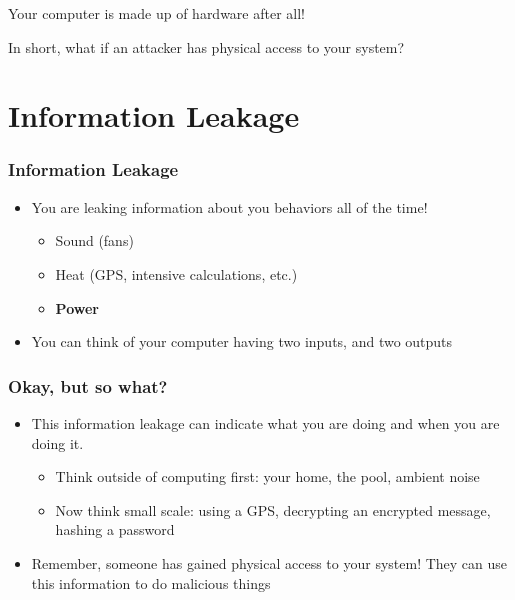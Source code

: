 \documentclass{beamer}
\begin{document}
\begin{frame}
    \begin{center}Your computer is made up of hardware after all!\end{center}
\end{frame}

\begin{frame}
    \begin{center}In short, what if an attacker has physical access to your system?\end{center}
\end{frame}
\section{}

\section{Information Leakage}

\begin{frame}[t]
\frametitle{Information Leakage}
\begin{itemize}
    \item You are leaking information about you behaviors all of the time!
    \begin{itemize}
        \item Sound (fans)
        \item Heat (GPS, intensive calculations, etc.)
        \item \textbf{Power}
    \end{itemize}
    \item You can think of your computer having two inputs, and two outputs
\end{itemize}
\end{frame}

\begin{frame}[t]
\frametitle{Okay, but so what?}
\begin{itemize}
    \item This information leakage can indicate what you are doing and when you are doing it.
    \begin{itemize}
        \item Think outside of computing first: your home, the pool, ambient noise
        \item Now think small scale: using a GPS, decrypting an encrypted message, hashing a password
    \end{itemize}
    \item Remember, someone has gained physical access to your system!
    They can use this information to do malicious things
\end{itemize}
\end{frame}
\end{document}
